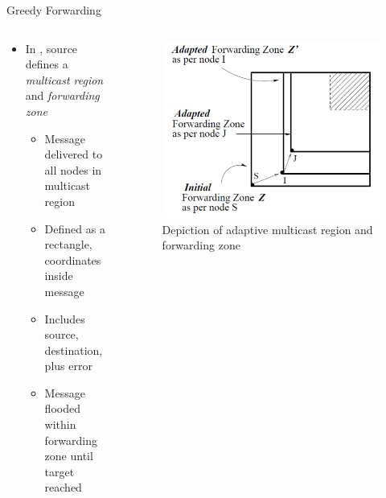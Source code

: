 \documentclass[pdftex]{beamer}
\begin{document}
\begin{frame}{Greedy Forwarding}
\begin{columns}
\begin{column}{.5\textwidth}
\begin{itemize}
	\item In \cite{749282}, source defines a \emph{multicast region} and \emph{forwarding zone}
		\begin{itemize}
			\item Message delivered to all nodes in multicast region
			\item Defined as a rectangle, coordinates inside message
			\item Includes source, destination, plus error
			\item Message flooded within forwarding zone until target reached
		\end{itemize}
\end{itemize}
\end{column}

\begin{column}{.5\textwidth}
\begin{figure}
\includegraphics[width=\textwidth]{adaptive_geocast_region}
\caption{Depiction of adaptive multicast region and forwarding zone}
\end{figure}
\end{column}
\end{columns}
\end{frame}
\end{document}
